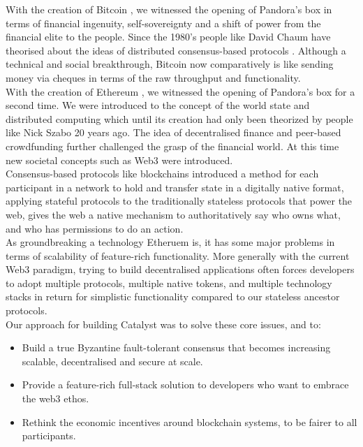 With the creation of Bitcoin \cite{nakamoto2008bitcoin}, we witnessed the opening of Pandora's box in terms of financial ingenuity, self-sovereignty and a shift of power from the financial elite to the people. Since the 1980's people like David Chaum have theorised about the ideas of distributed consensus-based protocols \cite{chaum1979computer}. Although a technical and social breakthrough, Bitcoin now comparatively is like sending money via cheques in terms of the raw throughput and functionality. \\

With the creation of Ethereum \cite{wood2014ethereum}, we witnessed the opening of Pandora's box for a second time. We were introduced to the concept of the world state and distributed computing which until its creation had only been theorized by people like Nick Szabo 20 years ago. The idea of decentralised finance and peer-based crowdfunding further challenged the grasp of the financial world. At this time new societal concepts such as Web3 were introduced. \\

Consensus-based protocols like blockchains introduced a method for each participant in a network to hold and transfer state in a digitally native format, applying stateful protocols to the traditionally stateless protocols that power the web, gives the web a native mechanism to authoritatively say who owns what, and who has permissions to do an action. \\

As groundbreaking a technology Etheruem is, it has some major problems in terms of scalability of feature-rich functionality. More generally with the current Web3 paradigm, trying to build decentralised applications often forces developers to adopt multiple protocols, multiple native tokens, and multiple technology stacks in return for simplistic functionality compared to our stateless ancestor protocols. \\

Our approach for building Catalyst was to solve these core issues, and to:

\begin{itemize}
\item Build a true Byzantine fault-tolerant consensus that becomes increasing scalable, decentralised and secure at scale.
\item Provide a feature-rich full-stack solution to developers who want to embrace the web3 ethos.
\item Rethink the economic incentives around blockchain systems, to be fairer to all participants.
\end{itemize}


